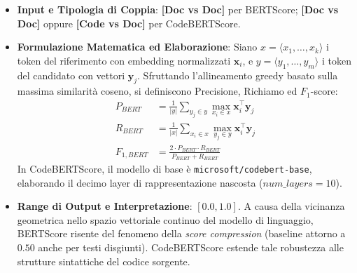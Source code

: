 \begin{itemize}[leftmargin=*, label=\textbullet]
    \item \textbf{Input e Tipologia di Coppia}: \textbf{[Doc vs Doc]} per BERTScore; \textbf{[Doc vs Doc]} oppure \textbf{[Code vs Doc]} per CodeBERTScore.
    \item \textbf{Formulazione Matematica ed Elaborazione}: Siano $x = \langle x_1, \dots, x_k \rangle$ i token del riferimento con embedding normalizzati $\mathbf{x}_i$, e $y = \langle y_1, \dots, y_m \rangle$ i token del candidato con vettori $\mathbf{y}_j$. Sfruttando l'allineamento greedy basato sulla massima similarità coseno, si definiscono Precisione, Richiamo ed $F_1$-score:
    \begin{align}
        P_{BERT} &= \frac{1}{|y|} \sum_{y_j \in y} \max_{x_i \in x} \mathbf{x}_i^\top \mathbf{y}_j \label{eq:bertscore_p} \\
        R_{BERT} &= \frac{1}{|x|} \sum_{x_i \in x} \max_{y_j \in y} \mathbf{x}_i^\top \mathbf{y}_j \label{eq:bertscore_r} \\
        F_{1, BERT} &= \frac{2 \cdot P_{BERT} \cdot R_{BERT}}{P_{BERT} + R_{BERT}} \label{eq:bertscore_f1}
    \end{align}
    In CodeBERTScore, il modello di base è \texttt{microsoft/codebert-base}, elaborando il decimo layer di rappresentazione nascosta ($num\_layers = 10$).
    \item \textbf{Range di Output e Interpretazione}: $[0.0, 1.0]$. A causa della vicinanza geometrica nello spazio vettoriale continuo del modello di linguaggio, BERTScore risente del fenomeno della \emph{score compression} (baseline attorno a $0.50$ anche per testi disgiunti). CodeBERTScore estende tale robustezza alle strutture sintattiche del codice sorgente.
\end{itemize}

